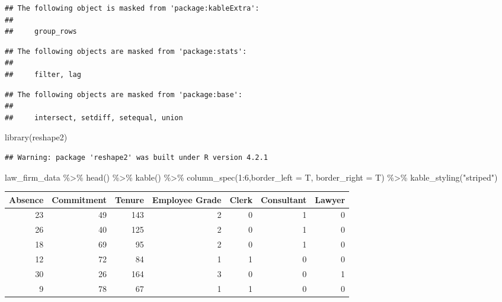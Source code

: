 \documentclass[
]{article}
\newenvironment{Shaded}{\begin{snugshade}}{\end{snugshade}}
\newcommand{\AttributeTok}[1]{\textcolor[rgb]{0.77,0.63,0.00}{#1}}
\newcommand{\DecValTok}[1]{\textcolor[rgb]{0.00,0.00,0.81}{#1}}
\newcommand{\FunctionTok}[1]{\textcolor[rgb]{0.00,0.00,0.00}{#1}}
\newcommand{\NormalTok}[1]{#1}
\newcommand{\SpecialCharTok}[1]{\textcolor[rgb]{0.00,0.00,0.00}{#1}}
\newcommand{\StringTok}[1]{\textcolor[rgb]{0.31,0.60,0.02}{#1}}
\begin{document}
\begin{verbatim}
## The following object is masked from 'package:kableExtra':
## 
##     group_rows
\end{verbatim}

\begin{verbatim}
## The following objects are masked from 'package:stats':
## 
##     filter, lag
\end{verbatim}

\begin{verbatim}
## The following objects are masked from 'package:base':
## 
##     intersect, setdiff, setequal, union
\end{verbatim}

\begin{Shaded}
\begin{Highlighting}[]
\FunctionTok{library}\NormalTok{(reshape2)}
\end{Highlighting}
\end{Shaded}

\begin{verbatim}
## Warning: package 'reshape2' was built under R version 4.2.1
\end{verbatim}

\begin{Shaded}
\begin{Highlighting}[]
\NormalTok{law\_firm\_data }\SpecialCharTok{\%\textgreater{}\%} \FunctionTok{head}\NormalTok{() }\SpecialCharTok{\%\textgreater{}\%} \FunctionTok{kable}\NormalTok{() }\SpecialCharTok{\%\textgreater{}\%} \FunctionTok{column\_spec}\NormalTok{(}\DecValTok{1}\SpecialCharTok{:}\DecValTok{6}\NormalTok{,}\AttributeTok{border\_left =}\NormalTok{ T, }\AttributeTok{border\_right =}\NormalTok{ T) }\SpecialCharTok{\%\textgreater{}\%} \FunctionTok{kable\_styling}\NormalTok{(}\StringTok{"striped"}\NormalTok{) }
\end{Highlighting}
\end{Shaded}

\begin{table}
\centering
\begin{tabular}{|>{}r|||>{}r|||>{}r|||>{}r|||>{}r|||>{}r||r}
\hline
Absence & Commitment & Tenure & Employee Grade & Clerk & Consultant & Lawyer\\
\hline
23 & 49 & 143 & 2 & 0 & 1 & 0\\
\hline
26 & 40 & 125 & 2 & 0 & 1 & 0\\
\hline
18 & 69 & 95 & 2 & 0 & 1 & 0\\
\hline
12 & 72 & 84 & 1 & 1 & 0 & 0\\
\hline
30 & 26 & 164 & 3 & 0 & 0 & 1\\
\hline
9 & 78 & 67 & 1 & 1 & 0 & 0\\
\hline
\end{tabular}
\end{table}
\end{document}
